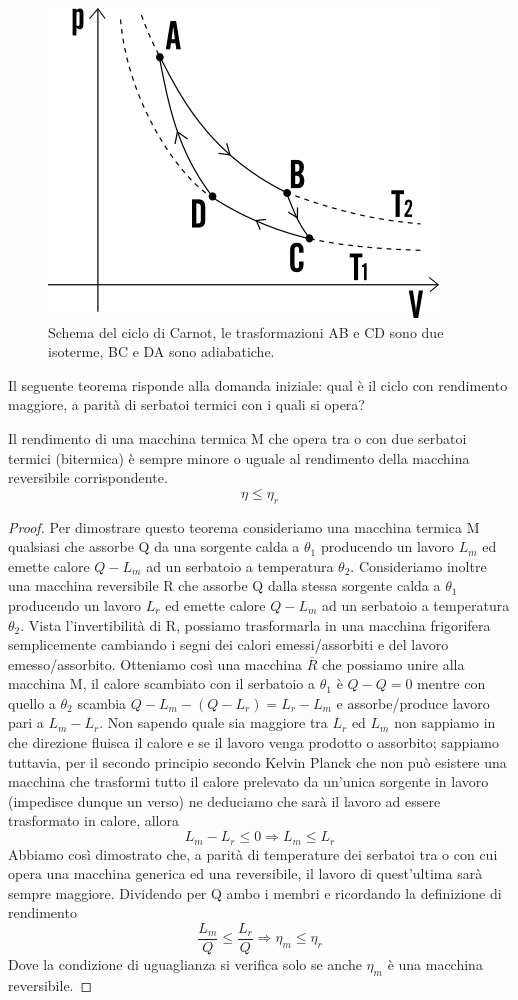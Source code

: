 \documentclass[
10pt, %
a4paper, %
oneside, %
headinclude,footinclude, %
BCOR5mm, %
]{scrartcl}
\begin{document}
\begin{figure}[h!]
	\centering
	\includegraphics[width=0.5\linewidth]{../images/ciclo_carnot}
	\caption{Schema del ciclo di Carnot, le trasformazioni AB e CD sono due isoterme, BC e DA sono adiabatiche.}
	\label{fig:ciclocarnot}
\end{figure}
\FloatBarrier
Il seguente teorema risponde alla domanda iniziale: qual è il ciclo con rendimento maggiore, a parità di serbatoi termici con i quali si opera? 
\begin{theorem}
	Il rendimento di una macchina termica M che opera tra o con due serbatoi termici (bitermica) è sempre minore o uguale al rendimento della macchina reversibile corrispondente.
	\[\eta \leq \eta_r\]
\end{theorem}
\begin{proof}
Per dimostrare questo teorema consideriamo una macchina termica M qualsiasi che assorbe Q da una sorgente calda a $\theta_1$ producendo un lavoro $L_m$ ed emette calore $Q-L_m$ ad un serbatoio a temperatura $\theta_2$. Consideriamo inoltre una macchina reversibile R che assorbe Q dalla stessa sorgente calda a $\theta_1$ producendo un lavoro $L_r$ ed emette calore $Q-L_m$ ad un serbatoio a temperatura $\theta_2$. Vista l'invertibilità di R, possiamo trasformarla in una macchina frigorifera semplicemente cambiando i segni dei calori emessi/assorbiti e del lavoro emesso/assorbito. Otteniamo così una macchina $\overline{R}$ che possiamo unire alla macchina M, il calore scambiato con il serbatoio a $\theta_1$ è \(Q-Q = 0\) mentre con quello a $\theta_2$ scambia \(Q-L_m - (Q-L_r) = L_r-L_m\) e assorbe/produce lavoro pari a \(L_m-L_r\). Non sapendo quale sia maggiore tra \(L_r\) ed \(L_m\) non sappiamo in che direzione fluisca il calore e se il lavoro venga prodotto o assorbito; sappiamo tuttavia, per il secondo principio secondo Kelvin Planck che non può esistere una macchina che trasformi tutto il calore prelevato da un'unica sorgente in lavoro (impedisce dunque un verso) ne deduciamo che sarà il lavoro ad essere trasformato in calore, allora \[L_m-L_r \leq 0 \Rightarrow L_m \leq L_r\] Abbiamo così dimostrato che, a parità di temperature dei serbatoi tra o con cui opera una macchina generica ed una reversibile, il lavoro di quest'ultima sarà sempre maggiore. Dividendo per Q ambo i membri e ricordando la definizione di rendimento
\[\frac{L_m }{Q} \leq \frac{L_r}{Q} \Rightarrow \eta_m \leq \eta_r\]
Dove la condizione di uguaglianza si verifica solo se anche $\eta_m$ è una macchina reversibile. 
\end{proof}
\end{document}
